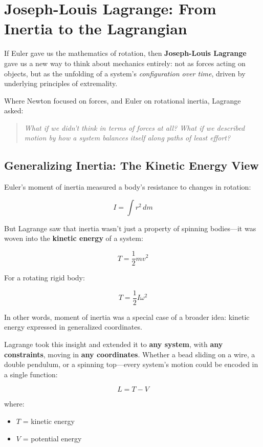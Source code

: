 \section{Joseph-Louis Lagrange: From Inertia to the Lagrangian}

If Euler gave us the mathematics of rotation, then \textbf{Joseph-Louis Lagrange} gave us a new way to think about mechanics entirely: not as forces acting on objects, but as the unfolding of a system’s \textit{configuration over time}, driven by underlying principles of extremality.

Where Newton focused on forces, and Euler on rotational inertia, Lagrange asked:

\begin{quote}
\textit{What if we didn’t think in terms of forces at all? What if we described motion by how a system balances itself along paths of least effort?}
\end{quote}

\subsection{Generalizing Inertia: The Kinetic Energy View}

Euler’s moment of inertia measured a body’s resistance to changes in rotation:

\[
I = \int r^2 \, dm
\]

But Lagrange saw that inertia wasn’t just a property of spinning bodies—it was woven into the \textbf{kinetic energy} of a system:

\[
T = \frac{1}{2} m v^2
\]

For a rotating rigid body:

\[
T = \frac{1}{2} I \omega^2
\]

In other words, moment of inertia was a special case of a broader idea: kinetic energy expressed in generalized coordinates.

Lagrange took this insight and extended it to \textbf{any system}, with \textbf{any constraints}, moving in \textbf{any coordinates}. Whether a bead sliding on a wire, a double pendulum, or a spinning top—every system’s motion could be encoded in a single function:

\[
L = T - V
\]

where:

\begin{itemize}
    \item \( T \) = kinetic energy
    \item \( V \) = potential energy
\end{itemize}

